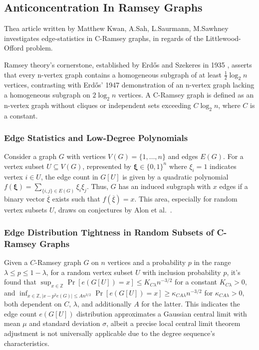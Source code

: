\newpage
\subsection{Anticoncentration In Ramsey Graphs}\label{sec:anticoncentration}
Thea article written by Matthew Kwan, A.Sah, L.Saurmann, M.Sawhney 
\cite{kwan2022anticoncentration} investigates edge-statistics in C-Ramsey graphs,
in regards of the Littlewood-Offord problem.

Ramsey theory's cornerstone,
established by Erdős and Szekeres in 1935
\cite{erdos1935combinatorial},
asserts that every n-vertex graph contains a homogeneous subgraph of
at least $\frac{1}{2} \log_2{n}$ vertices, contrasting with Erdős' 1947 demonstration
\cite{erdos1947some} of an n-vertex graph lacking a homogeneous 
subgraph on $2 \log_2{n}$ vertices. A C-Ramsey graph is defined as an 
n-vertex graph without cliques or independent sets exceeding \(C \log_2 n\),
where \(C\) is a constant.

\subsubsection{Edge Statistics and Low-Degree Polynomials}
Consider a graph $G$ with vertices $V(G) = \{1, \ldots, n\}$ and edges $E(G)$. For a vertex subset $U \subseteq V(G)$, represented by $\mathbf{\xi} \in \{0,1\}^n$ where $\xi_i = 1$ indicates vertex $i \in U$, the edge count in $G[U]$ is given by a quadratic polynomial $f(\mathbf{\xi}) = \sum_{\{i,j\} \in E(G)} \xi_i \xi_j$. Thus, $G$ has an induced subgraph with $x$ edges if a binary vector $\overline{\xi}$ exists such that $f(\overline{\xi})=x$. This area, especially for random vertex subsets $U$, draws on conjectures by Alon et al.~\cite{alon2020edge}.


\subsubsection{Edge Distribution Tightness in Random Subsets of C-Ramsey Graphs}
Given a $C$-Ramsey graph $G$ on $n$ vertices and a probability $p$ in the range $\lambda \leq p \leq 1 - \lambda$, for a random vertex subset $U$ with inclusion probability $p$, it's found that $\sup_{x \in \mathbb{Z}} \Pr[e(G[U]) = x] \leq K_{C\lambda} n^{-3/2}$ for a constant $K_{C\lambda} > 0$, and $\inf_{x \in \mathbb{Z}, |x - p^2 e(G)| \leq An^{3/2}} \Pr[e(G[U]) = x] \geq \kappa_{C A \lambda} n^{-3/2}$ for $\kappa_{C A \lambda} > 0$, both dependent on $C$, $\lambda$, and additionally $A$ for the latter. This indicates the edge count $e(G[U])$ distribution approximates a Gaussian central limit with mean $\mu$ and standard deviation $\sigma$, albeit a precise local central limit theorem adjustment is not universally applicable due to the degree sequence's characteristics.


